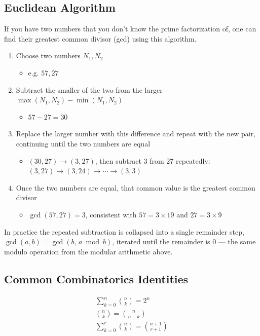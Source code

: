 \subsection{Euclidean Algorithm}

If you have two numbers that you don't know the prime factorization of, one can find their greatest common divisor (gcd) using this algorithm. 
\begin{enumerate}
\item Choose two numbers $N_1, N_2$ 
\begin{itemize}
\item	e.g. $57, 27$
\end{itemize}
\item Subtract the smaller of the two from the larger $\max(N_1,N_2) -\min(N_1,N_2)$
\begin{itemize}
\item	$57 -27 = 30$
\end{itemize}
\item Replace the larger number with this difference and repeat with the new pair, continuing until the two numbers are equal
\begin{itemize}
\item $(30,27)\to(3,27)$, then subtract $3$ from $27$ repeatedly: $(3,27)\to(3,24)\to\cdots\to(3,3)$
\end{itemize}
\item Once the two numbers are equal, that common value is the greatest common divisor
\begin{itemize}
\item $\gcd(57,27)=3$, consistent with $57 = 3\times 19$ and $27 = 3\times 9$
\end{itemize}
\end{enumerate}
In practice the repeated subtraction is collapsed into a single remainder step, $\gcd(a,b)=\gcd(b,\,a\bmod b)$, iterated until the remainder is $0$ --- the same modulo operation from the modular arithmetic above.

\subsection{Common Combinatorics Identities}
\begin{align}
    \sum_{k=0}^n \binom{n}{k} = 2^n \\
    \binom{n}{k} = \binom{n}{n-k} \\
    \sum_{k=0}^r \binom{n}{k} = \binom{n+1}{r+1}
\end{align}

